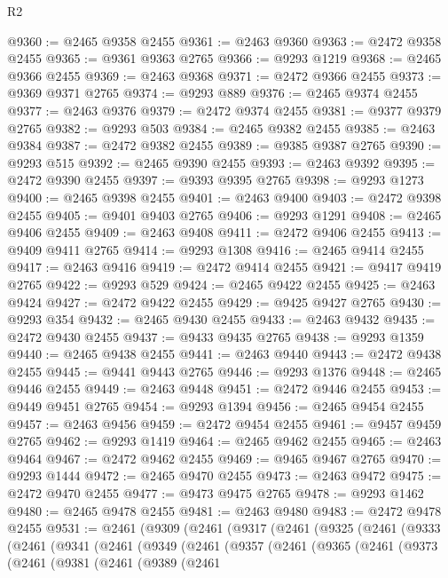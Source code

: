 \begin{lexlean}{R2}
\begin{coremodule}
@9360 := @2465 @9358 @2455
@9361 := @2463 @9360
@9363 := @2472 @9358 @2455
@9365 := @9361 @9363 @2765
@9366 := @9293 @1219
@9368 := @2465 @9366 @2455
@9369 := @2463 @9368
@9371 := @2472 @9366 @2455
@9373 := @9369 @9371 @2765
@9374 := @9293 @889
@9376 := @2465 @9374 @2455
@9377 := @2463 @9376
@9379 := @2472 @9374 @2455
@9381 := @9377 @9379 @2765
@9382 := @9293 @503
@9384 := @2465 @9382 @2455
@9385 := @2463 @9384
@9387 := @2472 @9382 @2455
@9389 := @9385 @9387 @2765
@9390 := @9293 @515
@9392 := @2465 @9390 @2455
@9393 := @2463 @9392
@9395 := @2472 @9390 @2455
@9397 := @9393 @9395 @2765
@9398 := @9293 @1273
@9400 := @2465 @9398 @2455
@9401 := @2463 @9400
@9403 := @2472 @9398 @2455
@9405 := @9401 @9403 @2765
@9406 := @9293 @1291
@9408 := @2465 @9406 @2455
@9409 := @2463 @9408
@9411 := @2472 @9406 @2455
@9413 := @9409 @9411 @2765
@9414 := @9293 @1308
@9416 := @2465 @9414 @2455
@9417 := @2463 @9416
@9419 := @2472 @9414 @2455
@9421 := @9417 @9419 @2765
@9422 := @9293 @529
@9424 := @2465 @9422 @2455
@9425 := @2463 @9424
@9427 := @2472 @9422 @2455
@9429 := @9425 @9427 @2765
@9430 := @9293 @354
@9432 := @2465 @9430 @2455
@9433 := @2463 @9432
@9435 := @2472 @9430 @2455
@9437 := @9433 @9435 @2765
@9438 := @9293 @1359
@9440 := @2465 @9438 @2455
@9441 := @2463 @9440
@9443 := @2472 @9438 @2455
@9445 := @9441 @9443 @2765
@9446 := @9293 @1376
@9448 := @2465 @9446 @2455
@9449 := @2463 @9448
@9451 := @2472 @9446 @2455
@9453 := @9449 @9451 @2765
@9454 := @9293 @1394
@9456 := @2465 @9454 @2455
@9457 := @2463 @9456
@9459 := @2472 @9454 @2455
@9461 := @9457 @9459 @2765
@9462 := @9293 @1419
@9464 := @2465 @9462 @2455
@9465 := @2463 @9464
@9467 := @2472 @9462 @2455
@9469 := @9465 @9467 @2765
@9470 := @9293 @1444
@9472 := @2465 @9470 @2455
@9473 := @2463 @9472
@9475 := @2472 @9470 @2455
@9477 := @9473 @9475 @2765
@9478 := @9293 @1462
@9480 := @2465 @9478 @2455
@9481 := @2463 @9480
@9483 := @2472 @9478 @2455
@9531 := @2461
    (@9309
      (@2461
        (@9317
          (@2461
            (@9325
              (@2461
                (@9333
                  (@2461
                    (@9341
                      (@2461
                        (@9349
                          (@2461
                            (@9357
                              (@2461
                                (@9365
                                  (@2461
                                    (@9373
                                      (@2461
                                        (@9381
                                          (@2461
                                            (@9389
                                              (@2461

\end{coremodule}
\end{lexlean}
